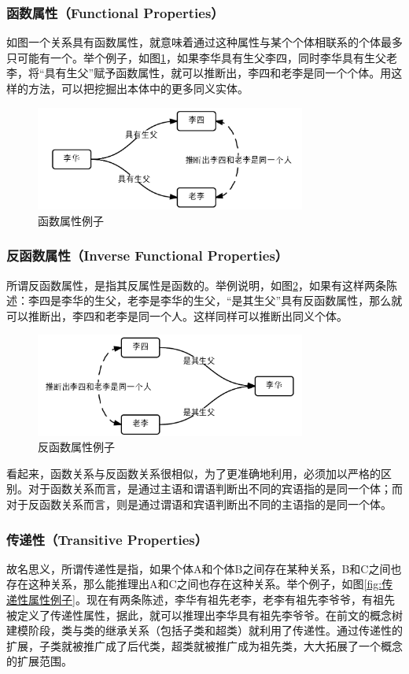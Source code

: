 \documentclass[12pt,a4paper]{article}
\begin{document}
		\subsubsection{函数属性（Functional Properties）}
	如图一个关系具有函数属性，就意味着通过这种属性与某个个体相联系的个体最多只可能有一个。举个例子，如图\ref{fig:函数属性例子}，如果李华具有生父李四，同时李华具有生父老李，将“具有生父”赋予函数属性，就可以推断出，李四和老李是同一个个体。用这样的方法，可以把挖掘出本体中的更多同义实体。	
	\begin{figure}[htbp] 
	\centering\includegraphics[width=3.5in]{fig/functionalPropertyExample.png} 
	\caption{函数属性例子}\label{fig:函数属性例子} 
	\end{figure} 
	
		\subsubsection{反函数属性（Inverse Functional Properties）}
	所谓反函数属性，是指其反属性是函数的。举例说明，如图\ref{fig:反函数属性例子}，如果有这样两条陈述：李四是李华的生父，老李是李华的生父，“是其生父”具有反函数属性，那么就可以推断出，李四和老李是同一个人。这样同样可以推断出同义个体。
	
	\begin{figure}[htbp] 
	\centering\includegraphics[width=3.5in]{fig/inverseFunctionalPropertyExample.png} 
	\caption{反函数属性例子}\label{fig:反函数属性例子} 
	\end{figure} 
	
	看起来，函数关系与反函数关系很相似，为了更准确地利用，必须加以严格的区别。对于函数关系而言，是通过主语和谓语判断出不同的宾语指的是同一个体；而对于反函数关系而言，则是通过谓语和宾语判断出不同的主语指的是同一个体。
		
		\subsubsection{传递性（Transitive Properties）}
	故名思义，所谓传递性是指，如果个体A和个体B之间存在某种关系，B和C之间也存在这种关系，那么能推理出A和C之间也存在这种关系。举个例子，如图\ref{fig:传递性属性例子}。现在有两条陈述，李华有祖先老李，老李有祖先李爷爷，有祖先被定义了传递性属性，据此，就可以推理出李华具有祖先李爷爷。在前文的概念树建模阶段，类与类的继承关系（包括子类和超类）就利用了传递性。通过传递性的扩展，子类就被推广成了后代类，超类就被推广成为祖先类，大大拓展了一个概念的扩展范围。
		
\end{document}
